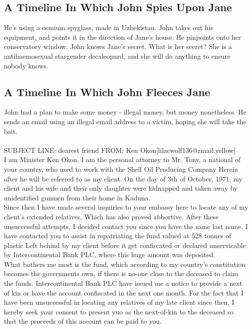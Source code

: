 \documentclass{article}
\begin{document}
\subsection{A Timeline In Which John Spies Upon Jane}


He's using a osmium spyglass, made in Uzbekistan.
John takes out his equipment, and points it in the direction of Jane's house. He pinpoints onto her conservatory window.
John knows Jane's secret. What is her secret? She is a antihaemosexual stargender decaleopard, and she will do anything to ensure nobody knows.
\subsection{A Timeline In Which John Fleeces Jane}


John had a plan to make some money {-} illegal money, but money nonetheless.
He sends an email using an illegal email address to a victim, hoping she will take the bait.
\\\\
SUBJECT LINE: dearest friend
FROM: Ken Okon[lilacwolf136@zmail.yellow]
\\
I am Minister Ken Okon.
I am the personal attorney to Mr. Tony, a national of your country, who used to work with the Shell Oil Producing Company
Herein after he will be referred to as my client.
On the day of 3th of October, 1971, my client and his wife and their only daughter were kidnapped and taken away by unidentified gunmen from their home in Kaduna.
\\
Since then I have made several inquiries to your embassy here to locate any of my client's extended relatives, Which has also proved abbortive.
After these unsuccessful attempts, I decided contact you since you have the same last name.
I have contacted you to assist in repatriating the fund valued at 528 tonnes of plastic Left behind by my client before it get confiscated or declared unservicable by Intercontinental Bank PLC, where this huge amount was deposited.
\\
What bothers me most is the fund, which according to my country's constitution becomes the governments own, if there is no{-}one close to the deceased to claim the funds.
Intercontinental Bank PLC have issued me a notice to provide a next of kin or have the account confiscated in the next one month.
For the fact that I have been unsuccessful in locating any relatives of my late client since then, I hereby seek your consent to present yuo as the next{-}of{-}kin to the deceased so that the proceeds of this account can be paid to you.
\end{document}

